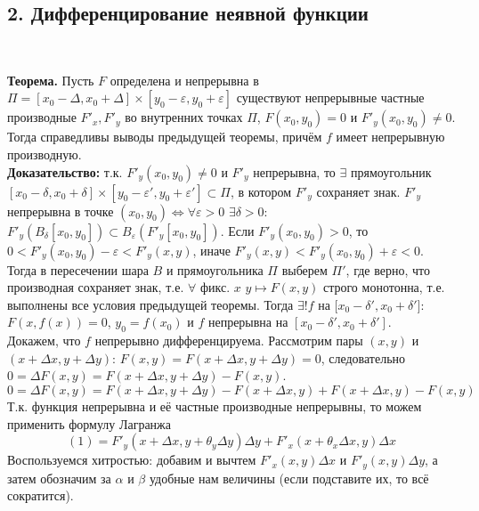 \documentclass[book, 11pt]{report}
\begin{document}
    \subsection*{2. Дифференцирование неявной функции}
    \par{\ }
    \par{\textbf{Теорема. }Пусть $F$ определена и непрерывна в $\Pi=[x_0-\Delta,x_0+\Delta]\times[y_0-\varepsilon,y_0+\varepsilon]$ существуют непрерывные частные производные $F'_x, F'_y$ во внутренних точках $\Pi$, $F(x_0,y_0)=0$ и $F'_y(x_0,y_0)\ne0$. Тогда справедливы выводы предыдущей теоремы, причём $f$ имеет непрерывную производную. \\
    \textbf{Доказательство: } т.к. $F'_y(x_0,y_0)\ne0$ и $F'_y$ непрерывна, то $\exists$ прямоугольник $[x_0-\delta,x_0+\delta]\times[y_0-\varepsilon',y_0+\varepsilon']\subset\Pi$, в котором $F'_y$ сохраняет знак. $F'_y$ непрерывна в точке $(x_0,y_0)\Leftrightarrow\forall\varepsilon>0$ $\exists\delta>0:$ $F'_y(B_\delta[x_0,y_0])\subset B_\varepsilon(F'_y[x_0,y_0])$. Если $F'_y(x_0,y_0)>0$, то $0<F'_y(x_0,y_0)-\varepsilon<F'_y(x,y)$, иначе $F'_y(x,y)<F'_y(x_0,y_0)+\varepsilon<0$. Тогда в пересечении шара $B$ и прямоугольника $\Pi$ выберем $\Pi'$, где верно, что производная сохраняет знак, т.е. $\forall$ фикс. $x$ $y\mapsto F(x,y)$ строго монотонна, т.е. выполнены все условия предыдущей теоремы. Тогда $\exists! f$ на [$x_0-\delta',x_0+\delta']$: $F(x,f(x))=0$, $y_0=f(x_0)$ и $f$ непрерывна на $[x_0-\delta',x_0+\delta']$. \\
    Докажем, что $f$ непрерывно дифференцируема. Рассмотрим пары $(x,y)$ и $(x+\Delta x, y+\Delta y)$: $F(x,y)=F(x+\Delta x, y+\Delta y)=0$, следовательно $0=\Delta F(x,y)=F(x+\Delta x,y+\Delta y)-F(x,y).$
    \begin{equation}
        0=\Delta F(x,y)=F(x+\Delta x,y+\Delta y)-F(x+\Delta x,y)+F(x+\Delta x,y)-F(x,y)
    \end{equation}
    Т.к. функция непрерывна и её частные производные непрерывны, то можем применить формулу Лагранжа
    \begin{equation}
        (1)=F'_y(x+\Delta x,y+\theta_y\Delta y)\Delta y+F'_x(x+\theta_x\Delta x,y)\Delta x
    \end{equation}
    Воспользуемся хитростью: добавим и вычтем $F'_x(x,y)\Delta x$ и $F'_y(x,y)\Delta y$, а затем обозначим за $\alpha$ и $\beta$ удобные нам величины (если подставите их, то всё сократится).
    \begin{equation}

\end{equation}}
\end{document}
